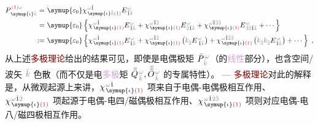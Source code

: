 \begin{subequations}
\begin{align}
	P^{\;\! \textcolor{Maroon}{(1)} \mathcolor{gray}{\omega}}_{\;\! \symup{\iota}\mathcolor{gray}{\bar{k}}} =&~ {\symup{\varepsilon_0}} \chi^{\;\! \mathcolor{gray}{\omega} \hat{1}}_{\;\! \symup{\iota} \mathcolor{gray}{\bar{k}} \textcolor{Maroon}{(1)}} E^{\;\!\mathcolor{gray}{\omega}}_{\;\! \hat{1} \mathcolor{gray}{\bar{k}}} \\ =&~ {\symup{\varepsilon_0}} \left\{ \chi^{\;\! \mathcolor{gray}{\omega} \hat{1}}_{\;\! \symup{\iota} \textcolor{Maroon}{(1)}} E^{\;\!\mathcolor{gray}{\omega}}_{\;\! \hat{1} \mathcolor{gray}{\bar{k}}} + \chi^{\;\! \mathcolor{gray}{\omega} \hat{1} \mathcolor{gray}{\hat{2}}}_{\;\! \symup{\iota} \textcolor{Maroon}{(1)}} E^{\;\!\mathcolor{gray}{\omega}}_{\;\! \mathcolor{gray}{\hat{2}} \hat{1} \mathcolor{gray}{\bar{k}}} + \chi^{\;\! \mathcolor{gray}{\omega} \hat{1} \mathcolor{gray}{\hat{2} \hat{3}}}_{\;\! \symup{\iota} \textcolor{Maroon}{(1)}} E^{\;\!\mathcolor{gray}{\omega}}_{\;\! \mathcolor{gray}{\hat{3} \hat{2}} \hat{1} \mathcolor{gray}{\bar{k}}} + \cdots \right\}  \label{eq:P(1)_wk} \\ :=&~ {\symup{\varepsilon_0}} \left\{ \chi^{\;\! \mathcolor{gray}{\omega} \hat{1}}_{\;\! \symup{\iota} \textcolor{Maroon}{(1)}} E^{\;\!\mathcolor{gray}{\omega}}_{\;\! \hat{1} \mathcolor{gray}{\bar{k}}} + \chi^{\;\! \mathcolor{gray}{\omega} \hat{1} \mathcolor{gray}{\hat{2}}}_{\;\! \symup{\iota} \textcolor{Maroon}{(1)}} \left( \mathcolor{gray}{k_{\hat{2}}} E^{\;\!\mathcolor{gray}{\omega}}_{\;\hat{1} \mathcolor{gray}{\bar{k}}} \right) + \chi^{\;\! \mathcolor{gray}{\omega} \hat{1} \mathcolor{gray}{\hat{2} \hat{3}}}_{\;\! \symup{\iota} \textcolor{Maroon}{(1)}} \left( \mathcolor{gray}{k_{\hat{3}}} \mathcolor{gray}{k_{\hat{2}}} E^{\;\!\mathcolor{gray}{\omega}}_{\;\! \hat{1} \mathcolor{gray}{\bar{k}}} \right) + \cdots \right\}~,
\end{align}
\end{subequations}
从上述\textcolor{Maroon}{多极理论}给出的结果可见，即使是电偶极矩 $\bar{P}^{\;\!\mathcolor{gray}{\omega}}_{\;\!\mathcolor{gray}{\bar{k}}}$（的\textcolor{Plum}{线性}部分），也含空间/\textcolor{PineGreen}{波矢} $\mathcolor{gray}{\bar{k}}$ \textcolor{NavyBlue}{色散}（而不仅是电\textcolor{Plum}{多极}矩 $\bar{\bar{Q}}^{\;\!\mathcolor{gray}{\omega}}_{\;\!\mathcolor{gray}{\bar{k}}},\bar{\bar{\bar{O}}}^{\;\!\mathcolor{gray}{\omega}}_{\;\!\mathcolor{gray}{\bar{k}}}$ 的专属特性）。 ---  \textcolor{Maroon}{多极理论}对此的解释是，从\textcolor{NavyBlue}{微观起源}上来讲，$\chi^{\;\! \mathcolor{gray}{\omega} \hat{1}}_{\;\! \symup{\iota} \textcolor{Maroon}{(1)}}$ 项来自于\textcolor{NavyBlue}{电偶-电偶}极相互作用、$\chi^{\;\! \mathcolor{gray}{\omega} \hat{1} \mathcolor{gray}{\hat{2}}}_{\;\! \symup{\iota} \textcolor{Maroon}{(1)}}$ 项起源于\textcolor{NavyBlue}{电偶-电四/磁偶}极相互作用、$\chi^{\;\! \mathcolor{gray}{\omega} \hat{1} \mathcolor{gray}{\hat{2} \hat{3}}}_{\;\! \symup{\iota} \textcolor{Maroon}{(1)}}$ 项则对应\textcolor{NavyBlue}{电偶-电八/磁四}极相互作用。

